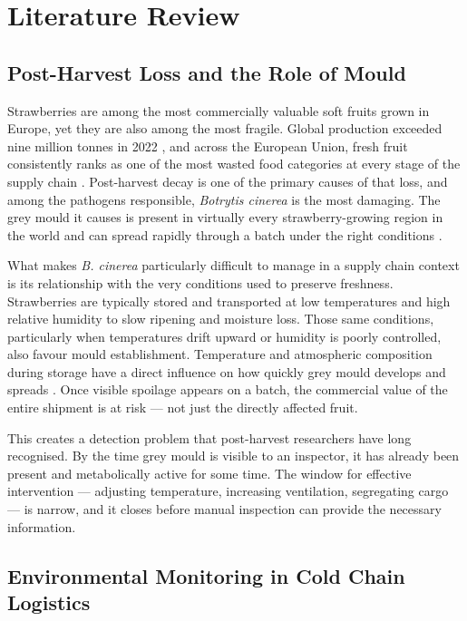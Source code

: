 \chapter{Literature Review}\label{chap:literature_review}

\section{Post-Harvest Loss and the Role of Mould}

Strawberries are among the most commercially valuable soft fruits grown in Europe, yet they are also among the most fragile. Global production exceeded nine million tonnes in 2022 \cite{FAOSTAT2024}, and across the European Union, fresh fruit consistently ranks as one of the most wasted food categories at every stage of the supply chain \cite{EC2019}. Post-harvest decay is one of the primary causes of that loss, and among the pathogens responsible, \textit{Botrytis cinerea} is the most damaging. The grey mould it causes is present in virtually every strawberry-growing region in the world and can spread rapidly through a batch under the right conditions \cite{Petrasch2019}.

What makes \textit{B. cinerea} particularly difficult to manage in a supply chain context is its relationship with the very conditions used to preserve freshness. Strawberries are typically stored and transported at low temperatures and high relative humidity to slow ripening and moisture loss. Those same conditions, particularly when temperatures drift upward or humidity is poorly controlled, also favour mould establishment. Temperature and atmospheric composition during storage have a direct influence on how quickly grey mould develops and spreads \cite{Nunes2012}. Once visible spoilage appears on a batch, the commercial value of the entire shipment is at risk --- not just the directly affected fruit.

This creates a detection problem that post-harvest researchers have long recognised. By the time grey mould is visible to an inspector, it has already been present and metabolically active for some time. The window for effective intervention --- adjusting temperature, increasing ventilation, segregating cargo --- is narrow, and it closes before manual inspection can provide the necessary information.

\section{Environmental Monitoring in Cold Chain Logistics}

